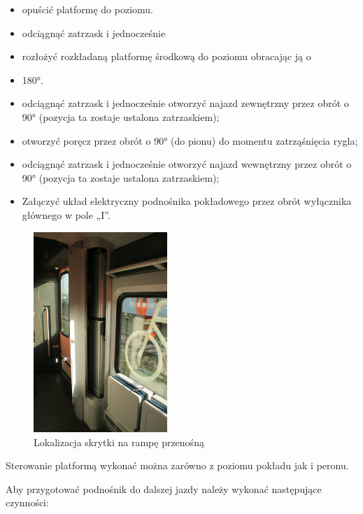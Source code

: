 \begin{itemize}
	\item opuścić platformę do poziomu.
	\item odciągnąć zatrzask i jednocześnie
	\item rozłożyć rozkładaną platformę środkową do poziomu obracając ją o
	\item 180°.
	\item odciągnąć zatrzask i jednocześnie otworzyć najazd zewnętrzny przez obrót o 90° (pozycja ta zostaje ustalona zatrzaskiem);
	\item otworzyć poręcz przez obrót o 90° (do pionu) do momentu  zatrząśnięcia rygla;
	\item odciągnąć zatrzask i jednocześnie otworzyć najazd wewnętrzny przez obrót o 90° (pozycja ta zostaje ustalona zatrzaskiem);
	\item Załączyć układ elektryczny podnośnika pokładowego przez obrót wyłącznika głównego w pole „I”.
\end{itemize}
\begin{figure}
	\includegraphics[width=0.45\textwidth]{skryptkierownik-img/skryptkierownik-img053.jpg}
	\caption{Lokalizacja skrytki na rampę przenośną}
\end{figure}
Sterowanie platformą wykonać można zarówno z poziomu pokładu jak i peronu.

Aby przygotować podnośnik do dalszej jazdy należy wykonać następujące czynności:

